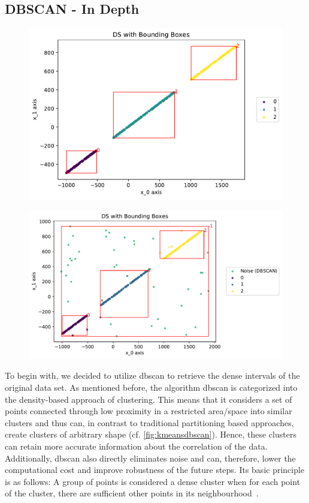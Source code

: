 \subsection{DBSCAN - In Depth}
\label{ssec:DBSCANindepth}
\begin{figure}
    \centering
    \begin{minipage}{.47\textwidth}
      \centering
      \includegraphics[width=.8\textwidth]{figures/DSwithDBSCANBoundingBoxes.pdf}
      \captionsetup{width=0.8\linewidth}
      \label{fig:cleandbscan}
    \end{minipage}%
    \begin{minipage}{.53 \textwidth}
      \centering
      \includegraphics[width=.8\textwidth]{figures/DBSCANwithNoise.pdf}
      \captionsetup{width=0.8\linewidth}
      \label{fig:noisydbscan}
    \end{minipage}
\end{figure}
To begin with, we decided to utilize \gls{dbscan} to retrieve the dense intervals of the original data set. 
As mentioned before, the algorithm \gls{dbscan} is categorized into the density-based approach of clustering. 
This means that it considers a set of points connected through low proximity in a restricted area/space into similar clusters and thus can, in contrast to traditional partitioning based approaches, create clusters of arbitrary shape (cf. \autoref{fig:kmeansdbscan}). 
Hence, these clusters can retain more accurate information about the correlation of the data. Additionally, \gls{dbscan} also directly eliminates noise and can, therefore, lower the computational cost and improve robustness of the future steps. 
Its basic principle is as follows:
A group of points is considered a dense cluster when for each point of the cluster, there are sufficient other points in its neighbourhood~\cite{DBSCANEKSX96}.

